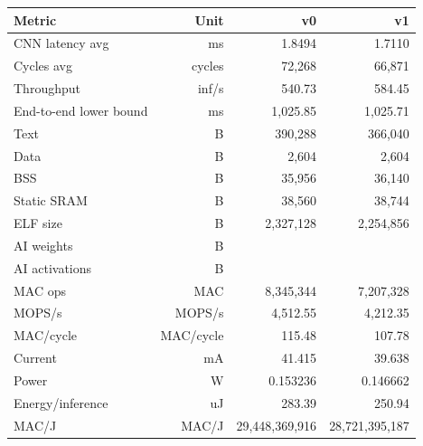 \begin{tabular}{lrrr}
\toprule
Metric & Unit & v0 & v1 \\
\midrule
CNN latency avg & ms & 1.8494 & 1.7110 \\
Cycles avg & cycles & 72,268 & 66,871 \\
Throughput & inf/s & 540.73 & 584.45 \\
End-to-end lower bound & ms & 1,025.85 & 1,025.71 \\
Text & B & 390,288 & 366,040 \\
Data & B & 2,604 & 2,604 \\
BSS & B & 35,956 & 36,140 \\
Static SRAM & B & 38,560 & 38,744 \\
ELF size & B & 2,327,128 & 2,254,856 \\
AI weights & B &  &  \\
AI activations & B &  &  \\
MAC ops & MAC & 8,345,344 & 7,207,328 \\
MOPS/s & MOPS/s & 4,512.55 & 4,212.35 \\
MAC/cycle & MAC/cycle & 115.48 & 107.78 \\
Current & mA & 41.415 & 39.638 \\
Power & W & 0.153236 & 0.146662 \\
Energy/inference & uJ & 283.39 & 250.94 \\
MAC/J & MAC/J & 29,448,369,916 & 28,721,395,187 \\
\bottomrule
\end{tabular}

